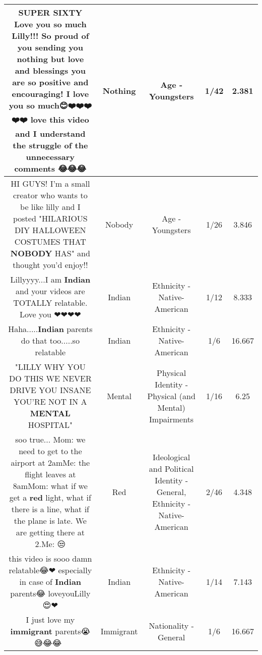 \documentclass[11pt]{article}
\newlength\mylength
\begin{document}
\begin{center}
\begin{longtable}{|C{.65\mylength}|C{.30\mylength}|C{.12\mylength}|C{.12\mylength}|C{.12\mylength}|}
  \small SUPER SIXTY Love you so much Lilly!!! So proud of you sending you \textbf{nothing} but love and blessings you are so positive and encouraging! I love you so much😊❤️❤️❤️❤️❤️ love this video and I understand the struggle of the unnecessary comments 😂😂😂\normalsize   & Nothing & Age - Youngsters & 1/42 & 2.381 \\  \hline
  \small HI GUYS! I'm a small creator who wants to be like lilly and I posted "HILARIOUS DIY HALLOWEEN COSTUMES THAT \textbf{NOBODY} HAS" and thought you'd enjoy!!\normalsize   & Nobody & Age - Youngsters & 1/26 & 3.846 \\  \hline
  \small Lillyyyy...I am \textbf{Indian} and your videos are TOTALLY  relatable. Love you ❤❤❤❤\normalsize   & Indian & Ethnicity - Native-American & 1/12 & 8.333 \\  \hline
  \small Haha.....\textbf{Indian} parents do that too.....so relatable\normalsize   & Indian & Ethnicity - Native-American & 1/6 & 16.667 \\  \hline
  \small "LILLY WHY YOU DO THIS WE NEVER DRIVE YOU INSANE YOU'RE NOT IN A \textbf{MENTAL} HOSPITAL"\normalsize   & Mental & Physical Identity - Physical (and Mental) Impairments & 1/16 & 6.25 \\  \hline
  \small soo true... Mom: we need to get to the airport at 2amMe: the flight leaves at 8amMom: what if we get a \textbf{r\textbf{ed}} light, what if there is a line, what if the plane is late. We are getting there at 2.Me: 😒\normalsize   & Red &  Ideological and Political Identity - General, Ethnicity - Native-American & 2/46 & 4.348 \\  \hline
  \small this video is sooo damn relatable😂❤ especially in case of \textbf{Indian} parents😂 loveyouLilly 😍❤\normalsize   & Indian & Ethnicity - Native-American & 1/14 & 7.143 \\  \hline
  \small I just love my \textbf{immigrant} parents😭😅😂😂👌🏼\normalsize   & Immigrant & Nationality - General & 1/6 & 16.667 \\  \hline

\end{longtable}
\end{center}
\end{document}
